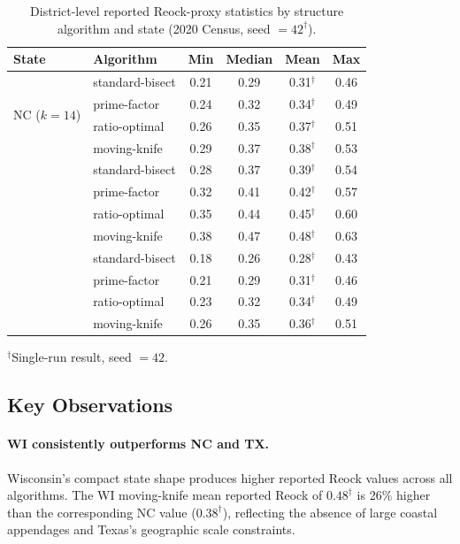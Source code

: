 \begin{table}[ht]
\centering
\caption{District-level reported Reock-proxy statistics by structure algorithm and state
(2020 Census, seed $= 42^\dagger$).}
\label{tab:reock_main}
\begin{tabular}{llcccc}
\toprule
State & Algorithm & Min & Median & Mean & Max \\
\midrule
\multirow{4}{*}{NC ($k=14$)}
  & standard-bisect & 0.21 & 0.29 & 0.31$^\dagger$ & 0.46 \\
  & prime-factor    & 0.24 & 0.32 & 0.34$^\dagger$ & 0.49 \\
  & ratio-optimal   & 0.26 & 0.35 & 0.37$^\dagger$ & 0.51 \\
  & moving-knife    & 0.29 & 0.37 & 0.38$^\dagger$ & 0.53 \\
\addlinespace
\multirow{4}{*}{WI ($k=8$)}
  & standard-bisect & 0.28 & 0.37 & 0.39$^\dagger$ & 0.54 \\
  & prime-factor    & 0.32 & 0.41 & 0.42$^\dagger$ & 0.57 \\
  & ratio-optimal   & 0.35 & 0.44 & 0.45$^\dagger$ & 0.60 \\
  & moving-knife    & 0.38 & 0.47 & 0.48$^\dagger$ & 0.63 \\
\addlinespace
\multirow{4}{*}{TX ($k=38$)}
  & standard-bisect & 0.18 & 0.26 & 0.28$^\dagger$ & 0.43 \\
  & prime-factor    & 0.21 & 0.29 & 0.31$^\dagger$ & 0.46 \\
  & ratio-optimal   & 0.23 & 0.32 & 0.34$^\dagger$ & 0.49 \\
  & moving-knife    & 0.26 & 0.35 & 0.36$^\dagger$ & 0.51 \\
\bottomrule
\end{tabular}
\begin{tablenotes}
\footnotesize
\item $^\dagger$Single-run result, seed $= 42$.
\end{tablenotes}
\end{table}

\subsection{Key Observations}

\paragraph{WI consistently outperforms NC and TX.}
Wisconsin's compact state shape produces higher reported Reock values across all algorithms.
The WI moving-knife mean reported Reock of $0.48^\dagger$ is 26\% higher than the
corresponding NC value ($0.38^\dagger$), reflecting the absence of large coastal
appendages and Texas's geographic scale constraints.

